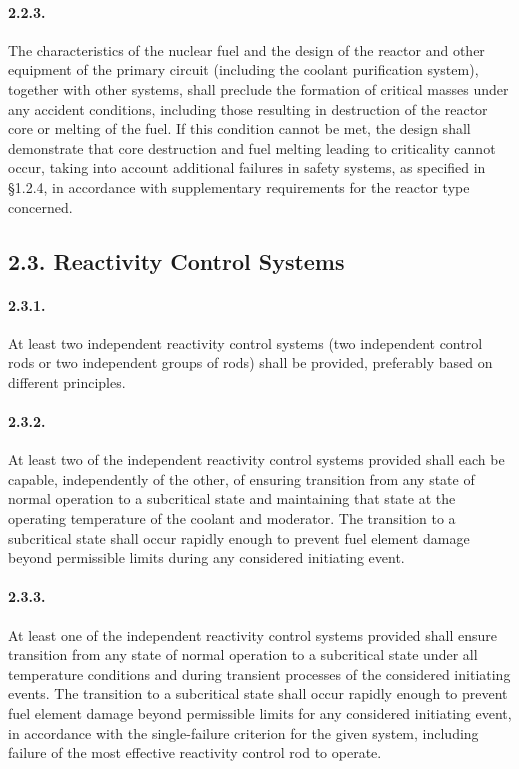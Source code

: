 \documentclass[openright]{bookest}
\begin{document}
\paragraph{2.2.3.}
The characteristics of the nuclear fuel and the design of the reactor and other equipment of the primary circuit (including the coolant purification system), together with other systems, shall preclude the formation of critical masses under any accident conditions, including those resulting in destruction of the reactor core or melting of the fuel.  
If this condition cannot be met, the design shall demonstrate that core destruction and fuel melting leading to criticality cannot occur, taking into account additional failures in safety systems, as specified in §1.2.4, in accordance with supplementary requirements for the reactor type concerned.

\subsection*{2.3. Reactivity Control Systems}

\paragraph{2.3.1.}
At least two independent reactivity control systems (two independent control rods or two independent groups of rods) shall be provided, preferably based on different principles.

\paragraph{2.3.2.}
At least two of the independent reactivity control systems provided shall each be capable, independently of the other, of ensuring transition from any state of normal operation to a subcritical state and maintaining that state at the operating temperature of the coolant and moderator.  
The transition to a subcritical state shall occur rapidly enough to prevent fuel element damage beyond permissible limits during any considered initiating event.

\paragraph{2.3.3.}
At least one of the independent reactivity control systems provided shall ensure transition from any state of normal operation to a subcritical state under all temperature conditions and during transient processes of the considered initiating events.  
The transition to a subcritical state shall occur rapidly enough to prevent fuel element damage beyond permissible limits for any considered initiating event, in accordance with the single-failure criterion for the given system, including failure of the most effective reactivity control rod to operate.
\end{document}
